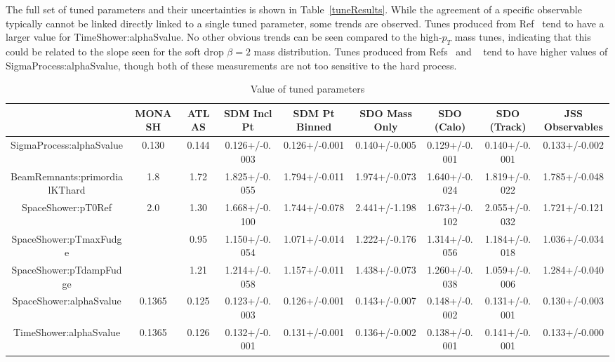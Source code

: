 The full set of tuned parameters and their uncertainties is shown in Table~\ref{tuneResults}. 
While the agreement of a specific observable typically cannot be linked directly linked to a single tuned parameter, some trends are observed.
Tunes produced from Ref~\cite{softdropObs} tend to have a larger value for TimeShower:alphaSvalue. No other obvious trends can be seen compared to the high-$p_T$ mass tunes, 
indicating that this could be related to the slope seen for the soft drop $\beta=2$ mass distribution.
Tunes produced from Refs~\cite{softdropObs} and ~\cite{jssObs} tend to have higher values of SigmaProcess:alphaSvalue, though both of these measurements are not too sensitive to the hard process.


\clearpage
\begin{landscape}
\begin{table}[ht!]
\caption{Value of tuned parameters}
\centering\begin{tabular}{ | c | | c | c | c | c | c | c | c | c |} \hline
                                     & MONASH   & ATLAS  & SDM Incl Pt   & SDM Pt Binned & SDO Mass Only & SDO (Calo)    & SDO (Track) & JSS Observables  \\ \hline
SigmaProcess:alphaSvalue             &  0.130   & 0.144  & 0.126+/-0.003 & 0.126+/-0.001 & 0.140+/-0.005 & 0.129+/-0.001 & 0.140+/-0.001 & 0.133+/-0.002 \\ \hline
BeamRemnants:primordialKThard        &  1.8     & 1.72   & 1.825+/-0.055 & 1.794+/-0.011 & 1.974+/-0.073 & 1.640+/-0.024 & 1.819+/-0.022 & 1.785+/-0.048 \\ \hline
SpaceShower:pT0Ref                   &  2.0     & 1.30   & 1.668+/-0.100 & 1.744+/-0.078 & 2.441+/-1.198 & 1.673+/-0.102 & 2.055+/-0.032 & 1.721+/-0.121 \\ \hline
SpaceShower:pTmaxFudge               &          & 0.95   & 1.150+/-0.054 & 1.071+/-0.014 & 1.222+/-0.176 & 1.314+/-0.056 & 1.184+/-0.018 & 1.036+/-0.034 \\ \hline
SpaceShower:pTdampFudge              &          & 1.21   & 1.214+/-0.058 & 1.157+/-0.011 & 1.438+/-0.073 & 1.260+/-0.038 & 1.059+/-0.006 & 1.284+/-0.040 \\ \hline
SpaceShower:alphaSvalue              &  0.1365  & 0.125  & 0.123+/-0.003 & 0.126+/-0.001 & 0.143+/-0.007 & 0.148+/-0.002 & 0.131+/-0.001 & 0.130+/-0.003 \\ \hline
TimeShower:alphaSvalue               &  0.1365  & 0.126  & 0.132+/-0.001 & 0.131+/-0.001 & 0.136+/-0.002 & 0.138+/-0.001 & 0.141+/-0.001 & 0.133+/-0.000 \\ \hline

\end{tabular}
\end{table}
\end{landscape}
